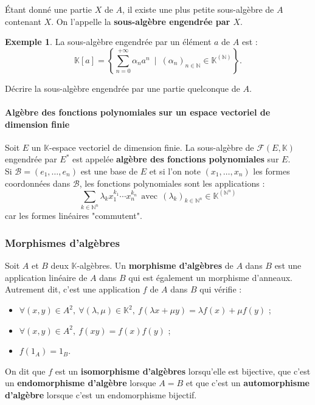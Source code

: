 \documentclass[french]{article}
\newcommand{\N}{\mathbb{N}}
\newcommand{\K}{\mathbb{K}}
\newcommand{\st}{^*}
\theoremstyle{plain}
\theoremstyle{definition}
\newtheorem*{ex}{Exemple}
\theoremstyle{remark}
\begin{document}
\begin{dfn}
	Étant donné une partie $X$ de $A$, il existe une plus petite sous-algèbre de $A$ contenant $X$. On l'appelle la \textbf{sous-algèbre engendrée par $X$}.
\end{dfn}

\begin{ex}
	La sous-algèbre engendrée par un élément $a$ de $A$ est : $$\K[a]=\left\{\sum_{n=0}^{+\infty}\alpha_na^n\ \mid\ (\alpha_n)_{n\in\N}\in\K^{(\N)}\right\}.$$
\end{ex}

\begin{exo}
	Décrire la sous-algèbre engendrée par une partie quelconque de $A$.
\end{exo}

\paragraph{Algèbre des fonctions polynomiales sur un espace vectoriel de dimension finie} Soit $E$ un $\K$-espace vectoriel de dimension finie. La sous-algèbre de $\mathcal{F}(E,\K)$ engendrée par $E\st$ est appelée \textbf{algèbre des fonctions polynomiales} sur $E$. \\
Si $\mathcal{B}=(e_1,\ldots,e_n)$ est une base de $E$ et si l'on note $(x_1,\ldots,x_n)$ les formes coordonnées dans $\mathcal{B}$, les fonctions polynomiales sont les applications : $$\sum_{k\in\N^n}\lambda_kx_1^{k_1}\cdots x_n^{k_n}\ \ \text{avec}\ \ (\lambda_k)_{k\in\N^n}\in\K^{(\N^n)}$$ car les formes linéaires "commutent".

\subsubsection*{Morphismes d'algèbres}

\begin{dfn}
	Soit $A$ et $B$ deux $\K$-algèbres. Un \textbf{morphisme d'algèbres} de $A$ dans $B$ est une application linéaire de $A$ dans $B$ qui est également un morphisme d'anneaux. \\ Autrement dit, c'est une application $f$ de $A$ dans $B$ qui vérifie :
	\begin{itemize}
		\item $\forall (x,y)\in A^2,\ \forall (\lambda,\mu)\in\K^2,\ f(\lambda x+\mu y)=\lambda f(x)+\mu f(y)$ ;
		\item $\forall (x,y)\in A^2,\ f(xy)=f(x)f(y)$ ;
		\item $f(1_A)=1_B$.
	\end{itemize}
	On dit que $f$ est un \textbf{isomorphisme d'algèbres} lorsqu'elle est bijective, que c'est un \textbf{endomorphisme d'algèbre} lorsque $A=B$ et que c'est un \textbf{automorphisme d'algèbre} lorsque c'est un endomorphisme bijectif.
\end{dfn}
\end{document}
